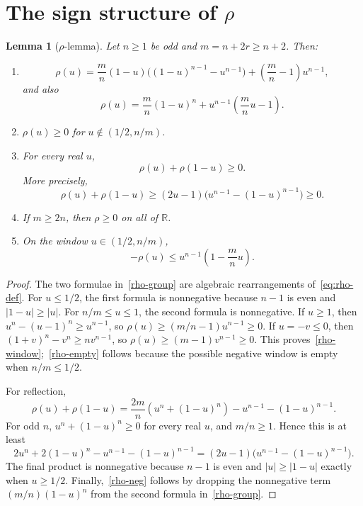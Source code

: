 \documentclass[11pt]{article}
\newtheorem{lemma}[theorem]{Lemma}
\begin{document}
\section{The sign structure of $\rho$}

\begin{lemma}[$\rho$-lemma]\label{lem:rho}
Let $n\ge1$ be odd and $m=n+2r\ge n+2$.  Then:
\begin{enumerate}[label=\textup{(\roman*)}]
\item\label{rho-group}
\[
        \rho(u)=\frac mn(1-u)\bigl((1-u)^{n-1}-u^{n-1}\bigr)
        +\left(\frac mn-1\right)u^{n-1},
\]
and also
\[
        \rho(u)=\frac mn(1-u)^n+u^{n-1}\left(\frac mn u-1\right).
\]
\item\label{rho-window}
$\rho(u)\ge0$ for $u\notin(1/2,n/m)$.
\item\label{rho-reflect}
For every real $u$,
\[
        \rho(u)+\rho(1-u)\ge0.
\]
More precisely,
\[
        \rho(u)+\rho(1-u)
        \ge (2u-1)\bigl(u^{n-1}-(1-u)^{n-1}\bigr)\ge0.
\]
\item\label{rho-empty}
If $m\ge2n$, then $\rho\ge0$ on all of $\mathbb R$.
\item\label{rho-neg}
On the window $u\in(1/2,n/m)$,
\[
        -\rho(u)\le u^{n-1}\left(1-\frac mn u\right).
\]
\end{enumerate}
\end{lemma}

\begin{proof}
The two formulae in~\ref{rho-group} are algebraic rearrangements of~\eqref{eq:rho-def}.  For $u\le1/2$, the first formula is nonnegative because $n-1$ is even and $|1-u|\ge |u|$.  For $n/m\le u\le1$, the second formula is nonnegative.  If $u\ge1$, then $u^n-(u-1)^n\ge u^{n-1}$, so $\rho(u)\ge(m/n-1)u^{n-1}\ge0$.  If $u=-v\le0$, then $(1+v)^n-v^n\ge nv^{n-1}$, so $\rho(u)\ge(m-1)v^{n-1}\ge0$.  This proves~\ref{rho-window};~\ref{rho-empty} follows because the possible negative window is empty when $n/m\le1/2$.

For reflection,
\[
        \rho(u)+\rho(1-u)=\frac{2m}{n}(u^n+(1-u)^n)-u^{n-1}-(1-u)^{n-1}.
\]
For odd $n$, $u^n+(1-u)^n\ge0$ for every real $u$, and $m/n\ge1$.  Hence this is at least
\[
        2u^n+2(1-u)^n-u^{n-1}-(1-u)^{n-1}
        =(2u-1)\bigl(u^{n-1}-(1-u)^{n-1}\bigr).
\]
The final product is nonnegative because $n-1$ is even and $|u|\ge|1-u|$ exactly when $u\ge1/2$.  Finally,~\ref{rho-neg} follows by dropping the nonnegative term $(m/n)(1-u)^n$ from the second formula in~\ref{rho-group}.
\end{proof}
\end{document}
